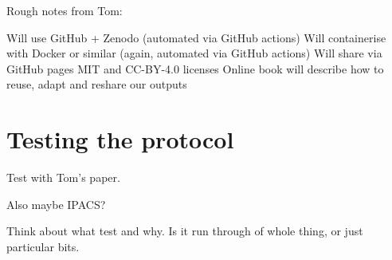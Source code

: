 Rough notes from Tom:

Will use GitHub + Zenodo (automated via GitHub actions)
Will containerise with Docker or similar (again, automated via GitHub actions)
Will share via GitHub pages
MIT and CC-BY-4.0 licenses
Online book will describe how to reuse, adapt and reshare our outputs

\section{Testing the protocol}

Test with Tom's paper.

Also maybe IPACS?

Think about what test and why. Is it run through of whole thing, or just particular bits.
